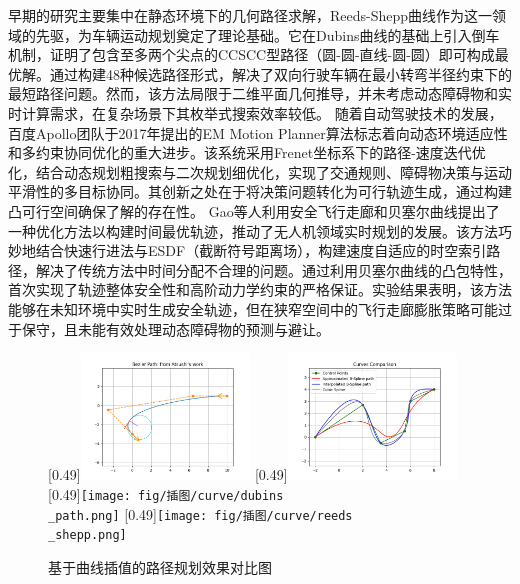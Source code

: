 \documentclass[master,academic]{ysuthesis} %
\begin{document}
		早期的研究主要集中在静态环境下的几何路径求解，Reeds-Shepp曲线作为这一领域的先驱，为车辆运动规划奠定了理论基础。它在Dubins曲线的基础上引入倒车机制，证明了包含至多两个尖点的CCSCC型路径（圆-圆-直线-圆-圆）即可构成最优解。通过构建48种候选路径形式，解决了双向行驶车辆在最小转弯半径约束下的最短路径问题。然而，该方法局限于二维平面几何推导，并未考虑动态障碍物和实时计算需求，在复杂场景下其枚举式搜索效率较低。
		随着自动驾驶技术的发展，百度Apollo团队于2017年提出的EM Motion Planner算法标志着向动态环境适应性和多约束协同优化的重大进步。该系统采用Frenet坐标系下的路径-速度迭代优化，结合动态规划粗搜索与二次规划细优化，实现了交通规则、障碍物决策与运动平滑性的多目标协同。其创新之处在于将决策问题转化为可行轨迹生成，通过构建凸可行空间确保了解的存在性。
		Gao等人利用安全飞行走廊和贝塞尔曲线提出了一种优化方法以构建时间最优轨迹，推动了无人机领域实时规划的发展。该方法巧妙地结合快速行进法与ESDF（截断符号距离场），构建速度自适应的时空索引路径，解决了传统方法中时间分配不合理的问题。通过利用贝塞尔曲线的凸包特性，首次实现了轨迹整体安全性和高阶动力学约束的严格保证。实验结果表明，该方法能够在未知环境中实时生成安全轨迹，但在狭窄空间中的飞行走廊膨胀策略可能过于保守，且未能有效处理动态障碍物的预测与避让。
		\begin{figure}[H]
			\centering
			[0.49\textwidth]{\includegraphics[width=0.4\textwidth]{fig/插图/curve/bezier.png}}
			[0.49\textwidth]{\includegraphics[width=0.4\textwidth]{fig/插图/curve/bspline.png}}
			[0.49\textwidth]{\texttt{[image: fig/插图/curve/dubins\\\_path.png]}}
			[0.49\textwidth]{\texttt{[image: fig/插图/curve/reeds\\\_shepp.png]}}
			\caption{基于曲线插值的路径规划效果对比图}
			\label{fig:基于曲线插值的路径规划}
		\end{figure}
\end{document}
